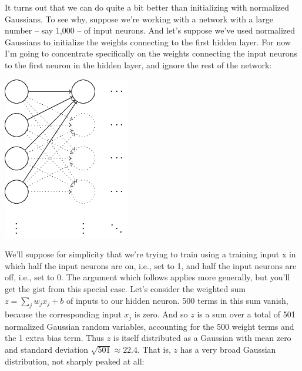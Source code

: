 \documentclass[a4paper,twoside,10pt]{book}
\begin{document}
It turns out that we can do quite a bit better than initializing with normalized Gaussians. To see why, suppose we're working with a network with a large number -- say 1,000 -- of input neurons. And let's suppose we've used normalized Gaussians to initialize the weights connecting to the first hidden layer. For now I'm going to concentrate specifically on the weights connecting the input neurons to the first neuron in the hidden layer, and ignore the rest of the network:
\begin{center}
	\includegraphics[width=0.35\linewidth]{figures/ch3/tikz32}
\end{center}
We'll suppose for simplicity that we're trying to train using a training input x in which half the input neurons are on, i.e., set to 1, and half the input neurons are off, i.e., set to 0. The argument which follows applies more generally, but you'll get the gist from this special case. Let's consider the weighted sum $z=\sum_jw_jx_j+b$ of inputs to our hidden neuron. 500 terms in this sum vanish, because the corresponding input $x_j$ is zero. And so $z$ is a sum over a total of 501 normalized Gaussian random variables, accounting for the 500 weight terms and the 1 extra bias term. Thus $z$ is itself distributed as a Gaussian with mean zero and standard deviation $\sqrt{501}\approx 22.4$. That is, $z$ has a very broad Gaussian distribution, not sharply peaked at all:

\end{document}
